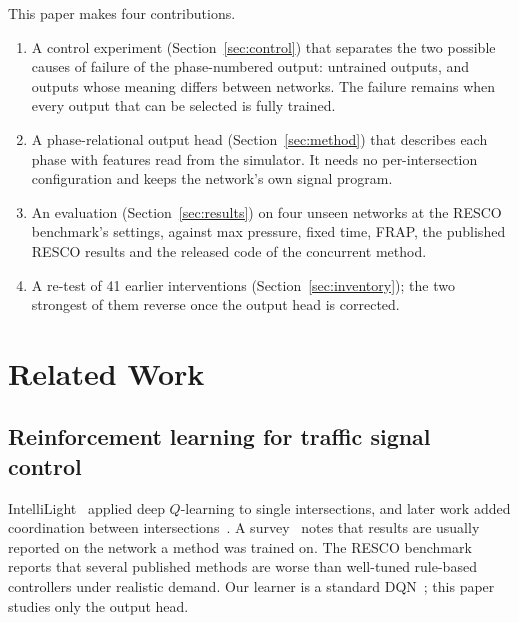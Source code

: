 \documentclass[conference]{IEEEtran}
\begin{document}
This paper makes four contributions.
\begin{enumerate}
\item A control experiment (Section~\ref{sec:control}) that separates the two possible
      causes of failure of the phase-numbered output: untrained outputs, and outputs whose
      meaning differs between networks. The failure remains when every output that can be
      selected is fully trained.
\item A phase-relational output head (Section~\ref{sec:method}) that describes each phase
      with features read from the simulator. It needs no per-intersection configuration
      and keeps the network's own signal program.
\item An evaluation (Section~\ref{sec:results}) on four unseen networks at the RESCO
      benchmark's settings, against max pressure, fixed time, FRAP, the published RESCO
      results and the released code of the concurrent method.
\item A re-test of 41 earlier interventions (Section~\ref{sec:inventory}); the two
      strongest of them reverse once the output head is corrected.
\end{enumerate}

\section{Related Work}\label{sec:related}

\subsection{Reinforcement learning for traffic signal control}
IntelliLight~\cite{intellilight} applied deep $Q$-learning to single intersections, and
later work added coordination between intersections~\cite{presslight,colight}. A
survey~\cite{survey} notes that results are usually reported on the network a method was
trained on. The RESCO benchmark~\cite{resco} reports that several published methods are
worse than well-tuned rule-based controllers under realistic demand. Our learner is a
standard DQN~\cite{dqn,ddqn,dueling}; this paper studies only the output head.
\end{document}
